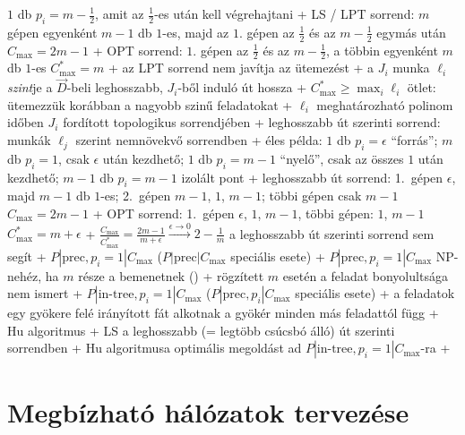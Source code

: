     $1$ db $p_i = m - \frac{1}{2}$, amit az $\frac{1}{2}$-es után
    kell végrehajtani
    + LS / LPT sorrend: $m$ gépen egyenként $m - 1$ db $1$-es, majd az
      $1$. gépen az $\frac{1}{2}$ és az $m - \frac{1}{2}$ egymás után \RA%
      $C_{\max} = 2m - 1$
    + OPT sorrend: $1$. gépen az $\frac{1}{2}$ és az $m -
      \frac{1}{2}$, a többin egyenként $m$ db $1$-es \RA $C_{\max}^* =
      m$
    + az LPT sorrend nem javítja az ütemezést
  + \dfn a $J_i$ munka $\ell_i$ \emph{szint}je a $\vec{D}$-beli
    leghosszabb, $J_i$-ből induló út hossza
    + $C_{\max}^* \ge \max_i \ell_i$ \RA ötlet: ütemezzük korábban a
      nagyobb szinű feladatokat
    + $\ell_i$ meghatározható polinom időben $J_i$ fordított
      topologikus sorrendjében
  + leghosszabb út szerinti sorrend: munkák $\ell_j$ szerint
    nemnövekvő sorrendben
  + éles példa: $1$ db $p_i = \epsilon$ ``forrás''; $m$ db $p_i = 1$,
    csak $\epsilon$ után kezdhető; $1$ db $p_i = m - 1$ ``nyelő'', csak
    az összes $1$ után kezdhető; $m - 1$ db $p_i = m - 1$ izolált pont
    + leghosszabb út sorrend: 1.~gépen $\epsilon$, majd $m - 1$ db
      $1$-es; 2.~gépen $m - 1$, $1$, $m - 1$; többi gépen csak $m - 1$
      \RA $C_{\max} = 2m - 1$
    + OPT sorrend: 1.~gépen $\epsilon$, $1$, $m - 1$, többi gépen:
      $1$, $m - 1$ \RA $C_{\max}^* = m + \epsilon$
    + $\frac{C_{\max}}{C_{\max}^*} = \frac{2m - 1}{m + \epsilon}
      \xrightarrow{\epsilon \to 0} 2 - \frac{1}{m}$ \RA a leghosszabb
      út szerinti sorrend sem segít
+ \prob $P|\textrm{prec}, p_i = 1|C_{\max}$
  ($P|\textrm{prec}|C_{\max}$ speciális esete)
  + \thm $P|\textrm{prec}, p_i = 1|C_{\max}$ NP-nehéz, ha $m$ része a
    bemenetnek (\noproof)
  + rögzített $m$ esetén a feladat bonyolultsága nem ismert
+ \prob $P|\textrm{in-tree}, p_i = 1|C_{\max}$
  ($P|\textrm{prec}, p_i|C_{\max}$ speciális esete)
  + a feladatok egy gyökere felé irányított fát alkotnak \RA a gyökér
    minden más feladattól függ
  + \alg Hu algoritmus
    + LS a leghosszabb (= legtöbb csúcsbó álló) út szerinti sorrendben
    + \thm Hu algoritmusa optimális megoldást ad $P|\textrm{in-tree},
      p_i = 1|C_{\max}$-ra
      + \noproof

\section{Megbízható hálózatok tervezése}


